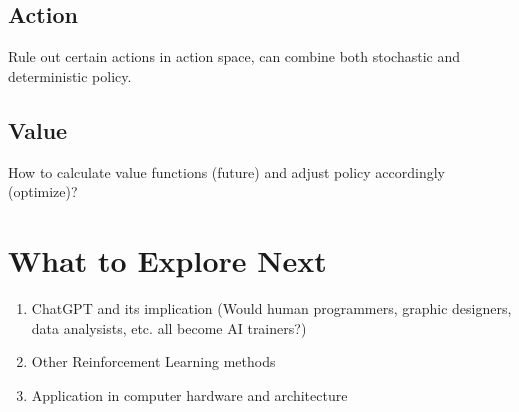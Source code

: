 \documentclass{article}
\begin{document}
    \subsection{Action}
      Rule out certain actions in action space, can combine both stochastic and deterministic policy.
    \subsection{Value}
      How to calculate value functions (future) and adjust policy accordingly (optimize)?
  
\section{What to Explore Next}
    \begin{enumerate}
      \item ChatGPT and its implication (Would human programmers, graphic designers, data analysists, etc. all become AI trainers?)
      \item Other Reinforcement Learning methods
      \item Application in computer hardware and architecture
    \end{enumerate}
 
\end{document}
